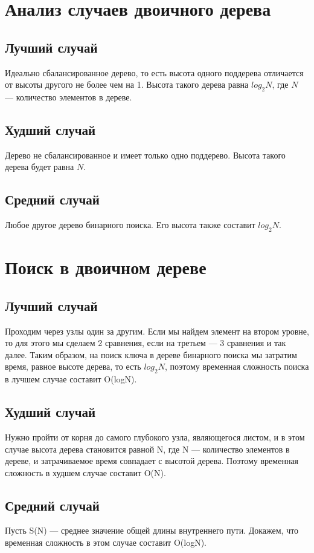 \documentclass[otchet]{SCWorks}
\begin{document}
\section{Анализ случаев двоичного дерева}
\subsection{Лучший случай}
Идеально сбалансированное дерево, то есть высота одного поддерева отличается от высоты другого не более чем на 1. Высота такого дерева равна $log_2 N$, где $N$ — количество элементов в дереве.

\subsection{Худший случай}
Дерево не сбалансированное и имеет только одно поддерево. Высота такого дерева будет равна $N$.

\subsection{Средний случай}
Любое другое дерево бинарного поиска. Его высота также составит
$log_2 N$.

\section{Поиск в двоичном дереве}
\subsection{Лучший случай}
Проходим через узлы один за другим. Если мы найдем элемент на втором уровне, то для этого мы сделаем 2 сравнения, если на третьем — 3 сравнения и так далее. Таким образом, на поиск ключа в дереве бинарного поиска мы затратим время, равное высоте дерева, то есть $log_2 N$, поэтому временная сложность  поиска в лучшем случае составит O(logN).

\subsection{Худший случай}
Нужно пройти от корня до самого глубокого узла, являющегося листом, и в этом случае высота дерева становится равной N, где N — количество элементов в дереве, и затрачиваемое время совпадает с высотой дерева. Поэтому временная сложность в худшем случае составит O(N).

\subsection{Средний случай}
Пусть S(N) — среднее значение общей длины внутреннего пути. Докажем, что временная сложность в этом случае составит O(logN).
\end{document}
